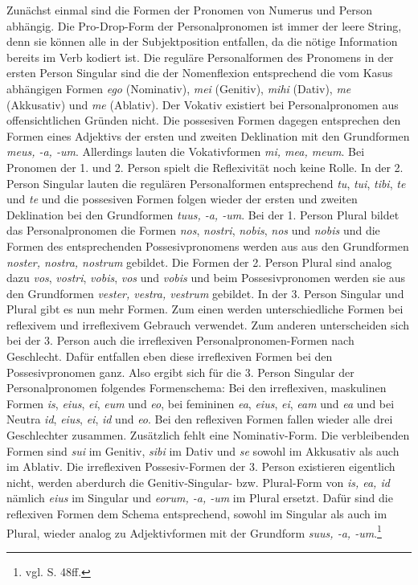 Zunächst einmal sind die Formen der Pronomen von Numerus und Person abhängig. Die Pro-Drop-Form der Personalpronomen ist immer der leere String, denn sie können alle in der Subjektposition entfallen, da die nötige Information bereits im Verb kodiert ist. Die reguläre Personalformen des Pronomens in der ersten Person Singular sind die der Nomenflexion entsprechend die vom Kasus abhängigen Formen \textit{ego} (Nominativ), \textit{mei} (Genitiv), \textit{mihi} (Dativ), \textit{me} (Akkusativ) und \textit{me} (Ablativ). Der Vokativ existiert bei Personalpronomen aus offensichtlichen Gründen nicht. Die possesiven Formen dagegen entsprechen den Formen eines Adjektivs der ersten und zweiten Deklination mit den Grundformen \textit{meus, -a, -um}. Allerdings lauten die Vokativformen \textit{mi, mea, meum}. Bei Pronomen der 1. und 2. Person spielt die Reflexivität noch keine Rolle. In der 2. Person Singular lauten die regulären Personalformen entsprechend \textit{tu}, \textit{tui}, \textit{tibi}, \textit{te} und \textit{te} und die possesiven Formen folgen wieder der ersten und zweiten Deklination bei den Grundformen \textit{tuus, -a, -um}. Bei der 1. Person Plural bildet das Personalpronomen die Formen \textit{nos}, \textit{nostri}, \textit{nobis}, \textit{nos} und \textit{nobis} und die Formen des entsprechenden Possesivpronomens werden aus aus den Grundformen \textit{noster, nostra, nostrum} gebildet. Die Formen der 2. Person Plural sind analog dazu \textit{vos}, \textit{vostri}, \textit{vobis}, \textit{vos} und \textit{vobis} und beim Possesivpronomen werden sie aus den Grundformen \textit{vester, vestra, vestrum} gebildet. In der 3. Person Singular und Plural gibt es nun mehr Formen. Zum einen werden unterschiedliche Formen bei reflexivem und irreflexivem Gebrauch verwendet. Zum anderen unterscheiden sich bei der 3. Person auch die irreflexiven Personalpronomen-Formen nach Geschlecht. Dafür entfallen eben diese irreflexiven Formen bei den Possesivpronomen ganz. Also ergibt sich für die 3. Person Singular der Personalpronomen folgendes Formenschema: Bei den irreflexiven, maskulinen Formen \textit{is}, \textit{eius}, \textit{ei}, \textit{eum} und \textit{eo}, bei femininen \textit{ea}, \textit{eius}, \textit{ei}, \textit{eam} und \textit{ea} und bei Neutra \textit{id}, \textit{eius}, \textit{ei}, \textit{id} und \textit{eo}. Bei den reflexiven Formen fallen wieder alle drei Geschlechter zusammen. Zusätzlich fehlt eine Nominativ-Form. Die verbleibenden Formen sind \textit{sui} im Genitiv, \textit{sibi} im Dativ und \textit{se} sowohl im Akkusativ als auch im Ablativ. Die irreflexiven Possesiv-Formen der 3. Person existieren eigentlich nicht, werden aberdurch die Genitiv-Singular- bzw. Plural-Form von \textit{is, ea, id} nämlich \textit{eius} im Singular und \textit{eorum, -a, -um} im Plural ersetzt. Dafür sind die reflexiven Formen dem Schema entsprechend, sowohl im Singular als auch im Plural, wieder analog zu Adjektivformen mit der Grundform \textit{suus, -a, -um}.\footnote{vgl. \cite{BAYER-LINDAUER1994} S. 48ff.} \par
